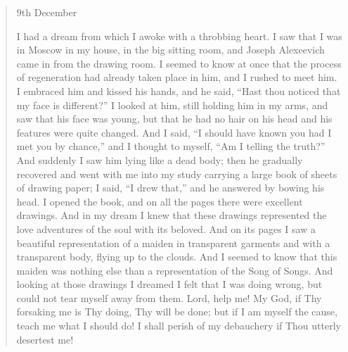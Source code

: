 \begin{quote}
9th December

I had a dream from which I awoke with a throbbing heart. I saw
that I was in Moscow in my house, in the big sitting room, and
Joseph Alexeevich came in from the drawing room. I seemed to know
at once that the process of regeneration had already taken place
in him, and I rushed to meet him. I embraced him and kissed his
hands, and he said, ``Hast thou noticed that my face is
different?'' I looked at him, still holding him in my arms, and
saw that his face was young, but that he had no hair on his head
and his features were quite changed. And I said, ``I should have
known you had I met you by chance,'' and I thought to myself,
``Am I telling the truth?'' And suddenly I saw him lying like a
dead body; then he gradually recovered and went with me into my
study carrying a large book of sheets of drawing paper; I said,
``I drew that,'' and he answered by bowing his head. I opened the
book, and on all the pages there were excellent drawings. And in
my dream I knew that these drawings represented the love
adventures of the soul with its beloved. And on its pages I saw a
beautiful representation of a maiden in transparent garments and
with a transparent body, flying up to the clouds. And I seemed to
know that this maiden was nothing else than a representation of
the Song of Songs. And looking at those drawings I dreamed I felt
that I was doing wrong, but could not tear myself away from
them. Lord, help me! My God, if Thy forsaking me is Thy doing,
Thy will be done; but if I am myself the cause, teach me what I
should do! I shall perish of my debauchery if Thou utterly
desertest me!

\end{quote}


